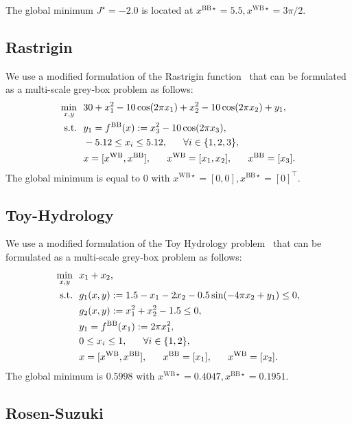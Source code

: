 \documentclass[12pt,a4paper]{article}%
\theoremstyle{plain}%
\theoremstyle{remark}%
\theoremstyle{definition}%
\def\WB{\mathrm{WB}}
\def\BB{\mathrm{BB}}
\begin{document}
\begin{appendices}
The global minimum $J^\star = -2.0$ is located at $x^{\BB\star}=5.5, x^{\WB\star}=3\pi/2$.

\subsection{Rastrigin}\label{subsec:app_rastrigin}

We use a modified formulation of the Rastrigin function~\cite{rastrigin1974} that can be formulated as a multi-scale grey-box problem as follows:
\begin{align} \label{eq:Rastrigin}
    \min_{x, y} &~~ 30 + x_1^2 - 10\cos(2\pi x_1) + x_2^2 - 10\cos(2\pi x_2) + y_1, \\\notag
    \text{s.t.} &~~ y_1 = f^\BB(x) := x_3^2 - 10\cos( 2 \pi x_3), \\\notag
    &~~ -5.12 \leq x_i \leq 5.12, ~~~~~ \forall i \in \{ 1, 2,3 \}, \\\notag
    &~~ x = [x^{\WB}, x^{\BB}], ~~~~~ x^{\WB} = [x_1, x_2], ~~~~~ x^{\BB} = [x_3].
\end{align}
The global minimum is equal to $0$ with $x^{\WB\star} = [0, 0], x^{\BB\star} = [0]^\top$.

\subsection{Toy-Hydrology}\label{subsec:app_hydrology}

We use a modified formulation of the Toy Hydrology problem~\cite{gramacy2016} that can be formulated as a multi-scale grey-box problem as follows:
\begin{align} \label{eq:ToyHydrology}
    \min_{x, y} &~~ x_1 + x_2, \\\notag
    \text{s.t.} &~~ g_1(x, y) := 1.5 - x_1 - 2x_2 - 0.5\sin(-4\pi x_2 + y_1) \leq 0, \\\notag
    &~~ g_2(x, y) := x_1^2 + x_2^2 - 1.5 \leq 0, \\\notag
    &~~ y_1 = f^\BB(x_1) := 2 \pi x_1^2, \\\notag
    &~~ 0 \leq x_i \leq 1, ~~~~~ \forall i \in \{ 1, 2 \}, \\\notag
    &~~ x = [x^{\WB}, x^{\BB}], ~~~~~ x^{\BB} = [x_1], ~~~~~ x^{\WB} = [x_2].
\end{align}
The global minimum is $0.5998$ with $x^{\WB\star} = 0.4047, x^{\BB\star} = 0.1951$.

\subsection{Rosen-Suzuki}\label{subsec:app_rosen_suzuki}


\end{appendices}
\end{document}
